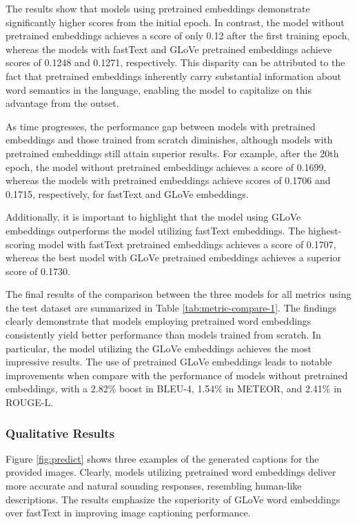 \documentclass[conference]{IEEEtran}
\begin{document}
The results show that models using pretrained embeddings demonstrate significantly higher scores from the initial epoch. In contrast, the model without pretrained embeddings achieves a score of only 0.12 after the first training epoch, whereas the models with fastText and GLoVe pretrained embeddings achieve scores of 0.1248 and 0.1271, respectively. This disparity can be attributed to the fact that pretrained embeddings inherently carry substantial information about word semantics in the language, enabling the model to capitalize on this advantage from the outset.


As time progresses, the performance gap between models with pretrained embeddings and those trained from scratch diminishes, although models with pretrained embeddings still attain superior results.  For example, after the 20th epoch, the model without pretrained embeddings achieves a score of 0.1699, whereas the models with pretrained embeddings achieve scores of 0.1706 and 0.1715, respectively, for fastText and GLoVe embeddings.


Additionally, it is important to highlight that the model using GLoVe embeddings outperforms the model utilizing fastText embeddings. The highest-scoring model with fastText pretrained embeddings achieves a score of 0.1707, whereas the best model with GLoVe pretrained embeddings achieves a superior score of 0.1730.


The final results of the comparison between the three models for all metrics using the test dataset are summarized in Table \ref{tab:metric-compare-1}. The findings clearly demonstrate that models employing pretrained word embeddings consistently yield better performance than models trained from scratch. In particular, the model utilizing the GLoVe embeddings achieves the most impressive results. The use of pretrained GLoVe embeddings leads to notable improvements when compare with the performance of models without pretrained embeddings, with a 2.82\% boost in BLEU-4, 1.54\% in METEOR, and 2.41\% in ROUGE-L.


\subsubsection{Qualitative Results}\hfill


Figure \ref{fig:predict} shows three examples of the generated captions for the provided images. Clearly, models utilizing pretrained word embeddings deliver more accurate and natural sounding responses, resembling human-like descriptions. The results emphasize the superiority of GLoVe word embeddings over fastText in improving image captioning performance. 
\end{document}

